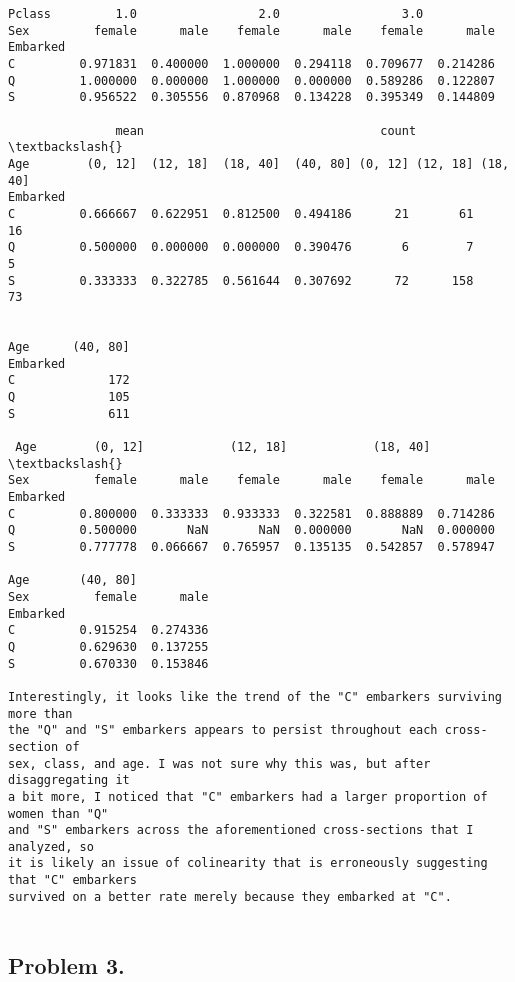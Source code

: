 \documentclass[11pt]{article}
\begin{document}
\begin{Verbatim}[commandchars=\\\{\}]
 Pclass         1.0                 2.0                 3.0          
Sex         female      male    female      male    female      male
Embarked                                                            
C         0.971831  0.400000  1.000000  0.294118  0.709677  0.214286
Q         1.000000  0.000000  1.000000  0.000000  0.589286  0.122807
S         0.956522  0.305556  0.870968  0.134228  0.395349  0.144809 

               mean                                 count                    \textbackslash{}
Age        (0, 12]  (12, 18]  (18, 40]  (40, 80] (0, 12] (12, 18] (18, 40]   
Embarked                                                                     
C         0.666667  0.622951  0.812500  0.494186      21       61       16   
Q         0.500000  0.000000  0.000000  0.390476       6        7        5   
S         0.333333  0.322785  0.561644  0.307692      72      158       73   

                   
Age      (40, 80]  
Embarked           
C             172  
Q             105  
S             611   

 Age        (0, 12]            (12, 18]            (18, 40]            \textbackslash{}
Sex         female      male    female      male    female      male   
Embarked                                                               
C         0.800000  0.333333  0.933333  0.322581  0.888889  0.714286   
Q         0.500000       NaN       NaN  0.000000       NaN  0.000000   
S         0.777778  0.066667  0.765957  0.135135  0.542857  0.578947   

Age       (40, 80]            
Sex         female      male  
Embarked                      
C         0.915254  0.274336  
Q         0.629630  0.137255  
S         0.670330  0.153846   

Interestingly, it looks like the trend of the "C" embarkers surviving more than
the "Q" and "S" embarkers appears to persist throughout each cross-section of 
sex, class, and age. I was not sure why this was, but after disaggregating it
a bit more, I noticed that "C" embarkers had a larger proportion of women than "Q"
and "S" embarkers across the aforementioned cross-sections that I analyzed, so
it is likely an issue of colinearity that is erroneously suggesting that "C" embarkers
survived on a better rate merely because they embarked at "C".
        

    \end{Verbatim}

    \subsection*{Problem 3.}\label{problem-3.}
\end{document}
